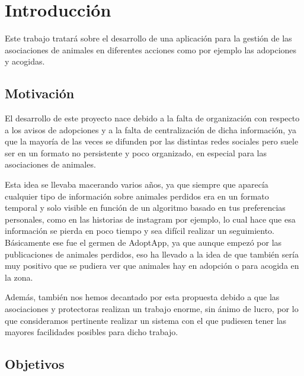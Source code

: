 
\chapter{Introducción}

Este trabajo tratará sobre el desarrollo de una aplicación para la gestión de las asociaciones de animales en diferentes acciones como por ejemplo las adopciones y acogidas.

\section{Motivación}

El desarrollo de este proyecto nace debido a la falta de organización con respecto a los avisos de adopciones y a la falta de centralización de dicha información, ya que la mayoría de las veces se difunden por las distintas redes sociales pero suele ser en un formato no persistente y poco organizado, en especial para las asociaciones de animales.

Esta idea se llevaba macerando varios años, ya que siempre que aparecía cualquier tipo de información sobre animales perdidos era en un formato temporal y solo visible en función de un algoritmo basado en tus preferencias personales, como en las historias de instagram por ejemplo, lo cual hace que esa información se pierda en poco tiempo y sea difícil realizar un seguimiento. Básicamente ese fue el germen de AdoptApp, ya que aunque empezó por las publicaciones de animales perdidos, eso ha llevado a la idea de que también sería muy positivo que se pudiera ver que animales hay en adopción o para acogida en la zona.

Además, también nos hemos decantado por esta propuesta debido a que las asociaciones y protectoras realizan un trabajo enorme, sin ánimo de lucro, por lo que consideramos pertinente realizar un sistema con el que pudiesen tener las mayores facilidades posibles para dicho trabajo.

\section{Objetivos}

